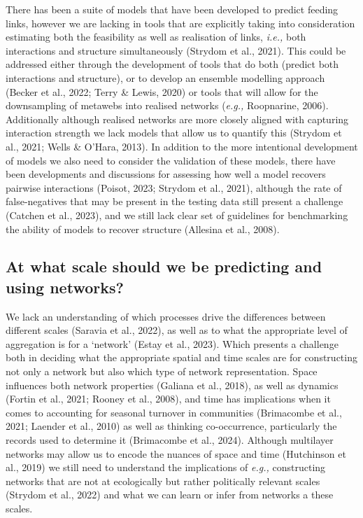 \documentclass[
]{article}
\begin{document}
There has been a suite of models that have been developed to predict
feeding links, however we are lacking in tools that are explicitly
taking into consideration estimating both the feasibility as well as
realisation of links, \emph{i.e.,} both interactions and structure
simultaneously (Strydom et al., 2021). This could be addressed either
through the development of tools that do both (predict both interactions
and structure), or to develop an ensemble modelling approach (Becker et
al., 2022; Terry \& Lewis, 2020) or tools that will allow for the
downsampling of metawebs into realised networks (\emph{e.g.,}
Roopnarine, 2006). Additionally although realised networks are more
closely aligned with capturing interaction strength we lack models that
allow us to quantify this (Strydom et al., 2021; Wells \& O'Hara, 2013).
In addition to the more intentional development of models we also need
to consider the validation of these models, there have been developments
and discussions for assessing how well a model recovers pairwise
interactions (Poisot, 2023; Strydom et al., 2021), although the rate of
false-negatives that may be present in the testing data still present a
challenge (Catchen et al., 2023), and we still lack clear set of
guidelines for benchmarking the ability of models to recover structure
(Allesina et al., 2008).

\subsection{At what scale should we be predicting and using
networks?}\label{at-what-scale-should-we-be-predicting-and-using-networks}

We lack an understanding of which processes drive the differences
between different scales (Saravia et al., 2022), as well as to what the
appropriate level of aggregation is for a `network' (Estay et al.,
2023). Which presents a challenge both in deciding what the appropriate
spatial and time scales are for constructing not only a network but also
which type of network representation. Space influences both network
properties (Galiana et al., 2018), as well as dynamics (Fortin et al.,
2021; Rooney et al., 2008), and time has implications when it comes to
accounting for seasonal turnover in communities (Brimacombe et al.,
2021; Laender et al., 2010) as well as thinking co-occurrence,
particularly the records used to determine it (Brimacombe et al., 2024).
Although multilayer networks may allow us to encode the nuances of space
and time (Hutchinson et al., 2019) we still need to understand the
implications of \emph{e.g.,} constructing networks that are not at
ecologically but rather politically relevant scales (Strydom et al.,
2022) and what we can learn or infer from networks a these scales.
\end{document}
